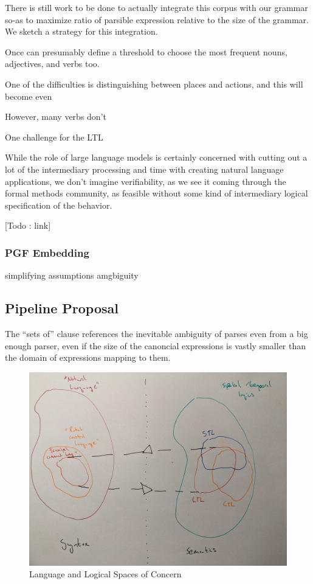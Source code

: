 \documentclass[a4paper, 11pt]{article}
\begin{document}
There is still work to be done to actually integrate this corpus with our
grammar so-as to maximize ratio of parsible expression relative to the size of the
grammar. We sketch a strategy for this integration.

Once can presumably define a
threshold to choose the most frequent nouns, adjectives, and verbs too.

One of the difficulties is distinguishing between places and actions, and this
will become even 

However,
many verbs don't 

One challenge for the LTL 


While the role of large language models is certainly concerned with cutting out
a lot of the intermediary processing and time with creating natural language
applications, we don't imagine verifiability, as we see it coming through the
formal methods community, as feasible without some kind of intermediary logical
specification of the behavior. 




[Todo : link]




\subsubsection{PGF Embedding}

simplifying assumptions
amgbiguity

\subsection{Pipeline Proposal}

The ``sets of'' clause
references the inevitable ambiguity of parses even from a big enough parser, even
if the size of the canoncial expressions is vastly smaller than the domain of
expressions mapping to them.

\begin{figure}[H]
\centering
\includegraphics[width=150mm]{pics/one.jpg}
\caption{Language and Logical Spaces of Concern} \label{fig:M1}
\end{figure}
\end{document}
